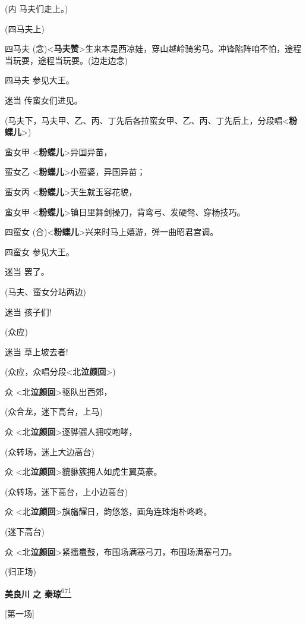 (内 马夫们走上。)

(四马夫上)

四马夫
(念)\textless{}\textbf{马夫赞}\textgreater{}生来本是西凉娃，穿山越岭骑劣马。冲锋陷阵咱不怕，途程当玩耍，途程当玩耍。(边走边念)

四马夫 参见大王。

迷当 传蛮女们进见。

(马夫下，马夫甲、乙、丙、丁先后各拉蛮女甲、乙、丙、丁先后上，分段唱\textless{}\textbf{粉蝶儿}\textgreater{})

蛮女甲 \textless{}\textbf{粉蝶儿}\textgreater{}异国异苗，

蛮女乙 \textless{}\textbf{粉蝶儿}\textgreater{}小蛮婆，异国异苗；

蛮女丙 \textless{}\textbf{粉蝶儿}\textgreater{}天生就玉容花貌，

蛮女甲
\textless{}\textbf{粉蝶儿}\textgreater{}镇日里舞剑操刀，背弯弓、发硬驽、穿杨技巧。

四蛮女
(合)\textless{}\textbf{粉蝶儿}\textgreater{}兴来时马上嬉游，弹一曲昭君宫调。

四蛮女 参见大王。

迷当 罢了。

(马夫、蛮女分站两边)

迷当 孩子们!

(众应)

迷当 草上坡去者!

(众应，众唱分段\textless{}北\textbf{泣颜回}\textgreater{})

众 \textless{}北\textbf{泣颜回}\textgreater{}驱队出西郊，

(众合龙，迷下高台，上马)

众 \textless{}北\textbf{泣颜回}\textgreater{}逐骅骝人拥哎咆哮，

(众转场，迷上大边高台)

众 \textless{}北\textbf{泣颜回}\textgreater{}貔貅簇拥人如虎生翼英豪。

(众转场，迷下高台，上小边高台)

众
\textless{}北\textbf{泣颜回}\textgreater{}旗旛耀日，韵悠悠，画角连珠炮朴咚咚。

(迷下高台)

众
\textless{}北\textbf{泣颜回}\textgreater{}紧擂鼍鼓，布围场满塞弓刀，布围场满塞弓刀。

(归正场)

\newpage
\textbf{美良川 之 秦琼}\protect\hyperlink{fn671}{\textsuperscript{671}}

{[}第一场{]}

